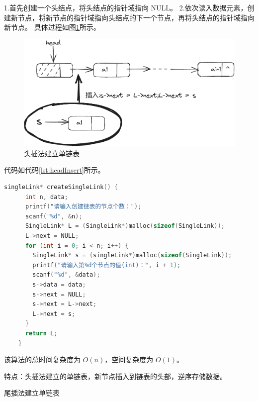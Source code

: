 \documentclass[lang=cn,newtx,10pt,scheme=chinese]{elegantbook}
\begin{document}
  1.首先创建一个头结点，将头结点的指针域指向 NULL。
  2.依次读入数据元素，创建新节点，将新节点的指针域指向头结点的下一个节点，再将头结点的指针域指向新节点。
  具体过程如图\ref{fig:headInsert}所示。
  \begin{figure}[h]
    \centering
    \includegraphics[width=1\textwidth]{./figure/pdf/cropped/headInsert.pdf}
    \caption{头插法建立单链表}
    \label{fig:headInsert}
  \end{figure}
  代码如代码\ref{lst:headInsert}所示。
  \begin{lstlisting}[language=C++, caption={头插法建立单链表示例代码}, label={lst:headInsert}]
    singleLink* createSingleLink() {
      int n, data;
      printf("请输入创建链表的节点个数：");
      scanf("%d", &n);
      SingleLink* L = (SingleLink*)malloc(sizeof(SingleLink));
      L->next = NULL;
      for (int i = 0; i < n; i++) {
        SingleLink* s = (singleLink*)malloc(sizeof(SingleLink));
        printf("请输入第%d个节点的值(int)：", i + 1);
        scanf("%d", &data);
        s->data = data;
        s->next = NULL;
        s->next = L->next;
        L->next = s;
      }
      return L;
    }
    \end{lstlisting}
    该算法的总时间复杂度为 $O(n)$，空间复杂度为 $O(1)$。

    特点：头插法建立的单链表，新节点插入到链表的头部，逆序存储数据。

  尾插法建立单链表
\end{document}
